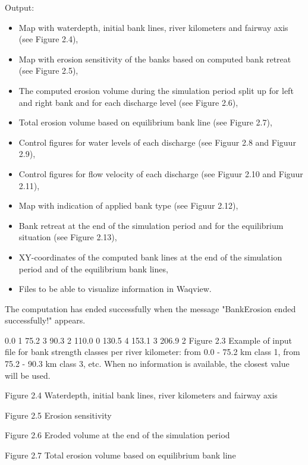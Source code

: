 Output:

\begin{itemize}
\item Map with waterdepth, initial bank lines, river kilometers and fairway axis (see Figure 2.4),
\item Map with erosion sensitivity of the banks based on computed bank retreat (see Figure 2.5),
\item The computed erosion volume during the simulation period split up for left and right bank and for each discharge level (see Figure 2.6),
\item Total erosion volume based on equilibrium bank line (see Figure 2.7),
\item Control figures for water levels of each discharge (see Figuur 2.8 and Figuur 2.9),
\item Control figures for flow velocity of each discharge (see Figuur 2.10 and Figuur 2.11),
\item Map with indication of applied bank type (see Figuur 2.12),
\item Bank retreat at the end of the simulation period and for the equilibrium situation (see Figure 2.13),
\item XY-coordinates of the computed bank lines at the end of the simulation period and of the equilibrium bank lines,
\item Files to be able to visualize information in Waqview.
\end{itemize}

The computation has ended successfully when the message "BankErosion ended successfully!" appears.

  0.0          1
  75.2         3
  90.3         2
  110.0        0
  130.5        4
  153.1        3
  206.9        2
Figure 2.3 Example of input file for bank strength classes per river kilometer: from 0.0 - 75.2 km class 1, from 75.2 - 90.3 km class 3, etc.
When no information is available, the closest value will be used.



Figure 2.4 Waterdepth, initial bank lines, river kilometers and fairway axis



Figure 2.5 Erosion sensitivity




Figure 2.6 Eroded volume at the end of the simulation period	





Figure 2.7 Total erosion volume based on equilibrium bank line	



